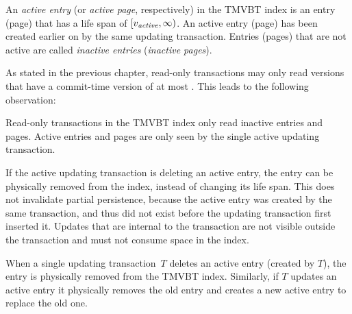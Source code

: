 \thmskip
\begin{definition}
\label{def:active-entries-pages}
An \emph{active entry} (or \emph{active page}, respectively) in the TMVBT
index is an entry (page) that has a life span of $[\smash{v_{\text{\textit{active}}}}, \infty)$. 
An active entry (page) has been created earlier on by the same updating
transaction.
Entries (pages) that are not active are called \emph{inactive entries}
(\emph{inactive pages}).
\end{definition}
\thmskip

As stated in the previous chapter, read-only transactions may only read
versions that have a commit-time version of at most \comver.
This leads to the following observation:

\thmskip
\begin{invariant}
\label{inv:tmvbt-read-only-inactive}
Read-only transactions in the TMVBT index only read inactive entries and
pages. 
Active entries and pages are only seen by the single active updating
transaction.
\end{invariant}
\thmskip

If the active updating transaction is deleting an active entry, the entry can
be physically removed from the index, instead of changing its life span.
This does not invalidate partial persistence, because the active entry was
created by the same transaction, and thus did not exist before the updating
transaction first inserted it.
Updates that are internal to the transaction are not visible outside
the transaction and must not consume space in the index.

\thmskip
\begin{invariant}
\label{inv:active-entries-physical-delete}
When a single updating transaction~$T$ deletes an active entry (created by
$T$), the entry is physically removed from the TMVBT index.
Similarly, if $T$ updates an active entry it physically removes the old entry
and creates a new active entry to replace the old one.
\end{invariant}
\thmskip

